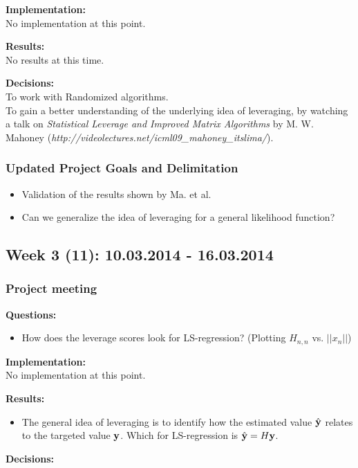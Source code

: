 \documentclass[11pt, a4paper]{article} %
\begin{document}
\textbf{Implementation:}\\
No implementation at this point.

\textbf{Results:}\\
No results at this time.

\textbf{Decisions:}\\
To work with Randomized algorithms.
\\
To gain a better understanding of the underlying idea of leveraging, by watching a talk on \emph{Statistical Leverage and Improved Matrix Algorithms} by M. W. Mahoney (\emph{http://videolectures.net/icml09\_mahoney\_itslima/}).

\subsubsection*{Updated Project Goals and Delimitation}
\begin{itemize}
\item Validation of the results shown by Ma. et al.
\item Can we generalize the idea of leveraging for a general likelihood function?
\end{itemize}

\subsection*{Week 3 (11): 10.03.2014 - 16.03.2014}
\subsubsection*{Project meeting}
\textbf{Questions:}\\
\begin{itemize}
\item How does the leverage scores look for LS-regression? (Plotting $H_{n,n}$ vs. $||x_n||$)
\end{itemize}
\textbf{Implementation:}\\
No implementation at this point.

\textbf{Results:}\\
\begin{itemize}
\item The general idea of leveraging is to identify how the estimated value $\hat{{\bf y}}$ relates to the targeted value ${\bf y}$. Which for LS-regression is $\hat{{\bf y}} = H {\bf y}$.
\end{itemize}

\textbf{Decisions:}\\
\end{document}
